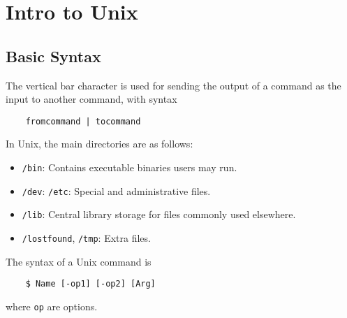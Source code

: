 \documentclass{tufte-book}
\begin{document}
\lstset{language=bash}

\chapter{Intro to Unix}

\section{Basic Syntax}
The vertical bar character is used for sending the output of a command as the input to another command, with syntax
\begin{lstlisting}
    fromcommand | tocommand
\end{lstlisting}
In Unix, the main directories are as follows:
\begin{itemize}
    \item \verb|/bin|: Contains executable binaries users may run.
    \item \verb|/dev|: \verb|/etc|: Special and administrative files.
    \item \verb|/lib|: Central library storage for files commonly used elsewhere.
    \item \verb|/lostfound|, \verb|/tmp|: Extra files.
\end{itemize}
The syntax of a Unix command is
\begin{lstlisting}
    $ Name [-op1] [-op2] [Arg]
\end{lstlisting}
where \verb|op| are options.
\end{document}
